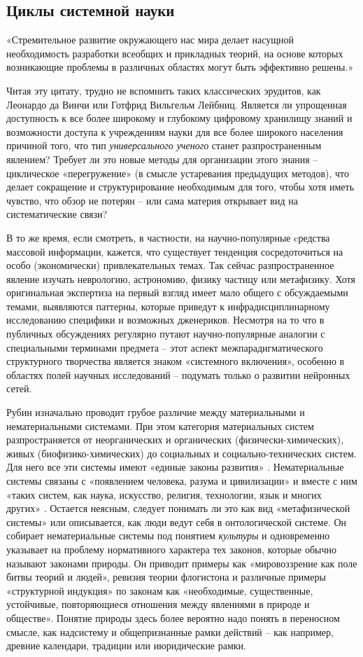 \documentclass[a4paper,11pt]{article}
\begin{document}
\subsection{Циклы системной науки}
«Стремительное развитие окружающего нас мира делает насущной необходимость
разработки всеобщих и прикладных теорий, на основе которых возникающие
проблемы в различных областях могут быть эффективно решены.» \cite{Rubin2002} 

Читая эту цитату, трудно не вспомнить таких классических эрудитов, как
Леонардо да Винчи или Готфрид Вильгельм Лейбниц. Является ли упрощенная
доступность к все более широкому и глубокому цифровому хранилищу знаний и
возможности доступа к учреждениям науки для все более широкого населения
причиной того, что тип \emph{универсального ученого} станет разпространенным
явлением? Требует ли это новые методы для организации этого знания --
циклическое «перегружение» (в смысле устаревания предыдущих методов), что
делает сокращение и структурирование необходимым для того, чтобы хотя иметь
чувство, что обзор не потерян -- или сама материя открывает вид на
систематические связи? 

В то же время, если смотреть, в частности, на научно-популярные cредства
массовой информации, кажется, что существует тенденция сосредоточиться на
особо (экономически) привлекательных темах. Так сейчас разпространенное
явление изучать неврологию, астрономию, физику частицу или метафизику. Хотя
оригинальная экспертиза на первый взгляд имеет мало общего с обсуждаемыми
темами, выявляются паттерны, которые приведут к инфрадисциплинарному
исследованию специфики и возможных дженериков. Несмотря на то что в публичных
обсуждениях регулярно путают научно-популярные аналогии с специальными
терминами предмета -- этот аспект межпарадигматического структурного
творчества является знаком «системного включения», особенно в областях
полей научных исследований -- подумать только о развитии нейронных сетей.

Рубин изначально проводит грубое различие между материальными и
нематериальными системами. При этом категория материальных систем
разпространяется от неорганических и органических (физически-химических),
живых (биофизико-химических) до социальных и социально-технических систем. Для
него все эти системы имеют «единые законы развития» \cite{Rubin2002}.
Нематериальные системы связаны с «появлением человека, разума и цивилизации»
\cite{Rubin2006} и вместе с ним «таких систем, как наука, искусство, религия,
технологии, язык и многих других» \cite{Rubin2006}. Остается неясным, следует
понимать ли это как вид «метафизической системы» или описывается, как люди
ведут себя в онтологической системе. Он собирает нематериальные системы под
понятием \emph{культуры} и одновременно указывает на проблему нормативного
характера тех законов, которые обычно называют законами природы.  Он приводит
примеры как «мировоззрение как поле битвы теорий и людей», ревизия теории
флогистона и различные примеры «структурной индукция» по законам как
«необходимые, существенные, устойчивые, повторяющиеся отношения между
явлениями в природе и обществе». Понятие природы здесь более вероятно надо
понять в переносном смысле, как надсистему и общепризнанные рамки действий --
как например, древние календари, традиции или июридические рамки.
\end{document}

